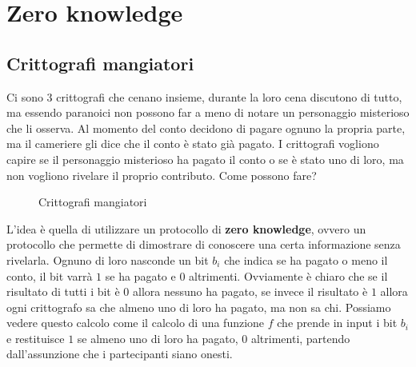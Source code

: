 \chapter{Zero knowledge}
\section{Crittografi mangiatori}
Ci sono 3 crittografi che cenano insieme, durante la loro cena discutono di tutto, ma essendo 
paranoici non possono far a meno di notare un personaggio misterioso che li osserva. Al momento 
del conto decidono di pagare ognuno la propria parte, ma il cameriere gli dice che il conto è
stato già pagato. I crittografi vogliono capire se il personaggio misterioso ha pagato il conto
o se è stato uno di loro, ma non vogliono rivelare il proprio contributo. Come possono fare?
\begin{figure}[H]
  \centering
  \caption{Crittografi mangiatori}
\end{figure}
L'idea è quella di utilizzare un protocollo di \textbf{zero knowledge}, ovvero un protocollo che
permette di dimostrare di conoscere una certa informazione senza rivelarla. Ognuno di loro 
nasconde un bit $b_i$ che indica se ha pagato o meno il conto, il bit varrà $1$ se ha pagato e $0$
altrimenti. 
Ovviamente è chiaro che se il risultato di tutti i bit è $0$ allora nessuno ha pagato, se invece
il risultato è $1$ allora ogni crittografo sa che almeno uno di loro ha pagato, ma non sa chi. Possiamo vedere 
questo calcolo come il calcolo di una funzione $f$ che prende in input i bit $b_i$ e restituisce
$1$ se almeno uno di loro ha pagato, $0$ altrimenti, partendo dall'assunzione che i partecipanti siano
onesti.

